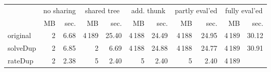 \makeatletter
\begin{tabular}{lrrrrrrrrrr}
 \\
& \multicolumn{2}{c}{no sharing}& \multicolumn{2}{c}{shared tree}& \multicolumn{2}{c}{add. thunk}& \multicolumn{2}{c}{partly eval'ed}& \multicolumn{2}{c}{fully eval'ed} \\
& MB & sec.& MB & sec.& MB & sec.& MB & sec.& MB & sec. \\ \midrule 
original%
&
 {\def\@currentlabel{2}\label{stats:Original:Unshared:mem}2} &
 {\def\@currentlabel{6.68}\label{stats:Original:Unshared:time}6.68}&
 {\def\@currentlabel{4\,189}\label{stats:Original:Shared:mem}4\,189} &
 {\def\@currentlabel{25.40}\label{stats:Original:Shared:time}25.40}&
 {\def\@currentlabel{4\,188}\label{stats:Original:SharedThunk:mem}4\,188} &
 {\def\@currentlabel{24.49}\label{stats:Original:SharedThunk:time}24.49}&
 {\def\@currentlabel{4\,188}\label{stats:Original:SharedEvaled:mem}4\,188} &
 {\def\@currentlabel{24.95}\label{stats:Original:SharedEvaled:time}24.95}&
 {\def\@currentlabel{4\,189}\label{stats:Original:SharedFull:mem}4\,189} &
 {\def\@currentlabel{30.12}\label{stats:Original:SharedFull:time}30.12} \\
\textsf{solveDup}%
&
 {\def\@currentlabel{2}\label{stats:SolveDup:Unshared:mem}2} &
 {\def\@currentlabel{6.85}\label{stats:SolveDup:Unshared:time}6.85}&
 {\def\@currentlabel{2}\label{stats:SolveDup:Shared:mem}2} &
 {\def\@currentlabel{6.69}\label{stats:SolveDup:Shared:time}6.69}&
 {\def\@currentlabel{4\,188}\label{stats:SolveDup:SharedThunk:mem}4\,188} &
 {\def\@currentlabel{24.88}\label{stats:SolveDup:SharedThunk:time}24.88}&
 {\def\@currentlabel{4\,188}\label{stats:SolveDup:SharedEvaled:mem}4\,188} &
 {\def\@currentlabel{24.77}\label{stats:SolveDup:SharedEvaled:time}24.77}&
 {\def\@currentlabel{4\,189}\label{stats:SolveDup:SharedFull:mem}4\,189} &
 {\def\@currentlabel{30.91}\label{stats:SolveDup:SharedFull:time}30.91} \\
\textsf{rateDup}%
&
 {\def\@currentlabel{2}\label{stats:RateDup:Unshared:mem}2} &
 {\def\@currentlabel{2.38}\label{stats:RateDup:Unshared:time}2.38}&
 {\def\@currentlabel{5}\label{stats:RateDup:Shared:mem}5} &
 {\def\@currentlabel{2.40}\label{stats:RateDup:Shared:time}2.40}&
 {\def\@currentlabel{5}\label{stats:RateDup:SharedThunk:mem}5} &
 {\def\@currentlabel{2.40}\label{stats:RateDup:SharedThunk:time}2.40}&
 {\def\@currentlabel{5}\label{stats:RateDup:SharedEvaled:mem}5} &
 {\def\@currentlabel{2.40}\label{stats:RateDup:SharedEvaled:time}2.40}&
 {\def\@currentlabel{4\,189}\label{stats:RateDup:SharedFull:mem}4\,189} &

\end{tabular}
